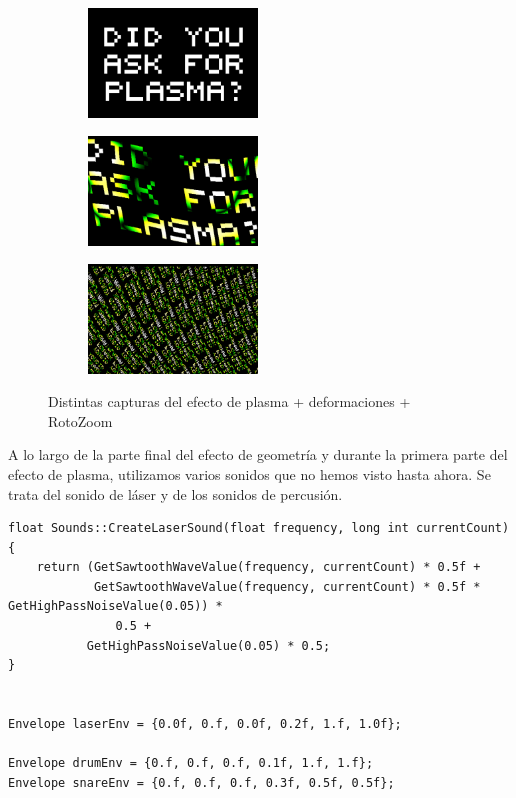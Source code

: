 \begin{figure}[h]
	\centering
	\begin{subfigure}[b]{0.3\textwidth}
		\centering
		\includegraphics[width=4.5cm]{archivos/plasma5}
	\end{subfigure}
	\begin{subfigure}[b]{0.3\textwidth}
		\centering
		\includegraphics[width=4.5cm]{archivos/plasma6}
	\end{subfigure}
	\begin{subfigure}[b]{0.3\textwidth}
		\centering
		\includegraphics[width=4.5cm]{archivos/plasma7}
	\end{subfigure}
	\caption{Distintas capturas del efecto de plasma + deformaciones + RotoZoom}
	\label{fig:finalPlasma}
\end{figure}

A lo largo de la parte final del efecto de geometría y durante la primera parte del efecto de plasma, utilizamos varios sonidos que no hemos visto hasta ahora. Se trata del sonido de láser y de los sonidos de percusión.\\

\begin{lstlisting}[style=C-color, caption={Otros sonidos empleados en la demo},label=cod:moresound, escapechar=[]
float Sounds::CreateLaserSound(float frequency, long int currentCount)
{
    return (GetSawtoothWaveValue(frequency, currentCount) * 0.5f +
            GetSawtoothWaveValue(frequency, currentCount) * 0.5f * GetHighPassNoiseValue(0.05)) *
               0.5 +
           GetHighPassNoiseValue(0.05) * 0.5;
}


Envelope laserEnv = {0.0f, 0.f, 0.0f, 0.2f, 1.f, 1.0f};

Envelope drumEnv = {0.f, 0.f, 0.f, 0.1f, 1.f, 1.f};
Envelope snareEnv = {0.f, 0.f, 0.f, 0.3f, 0.5f, 0.5f};
\end{lstlisting}

